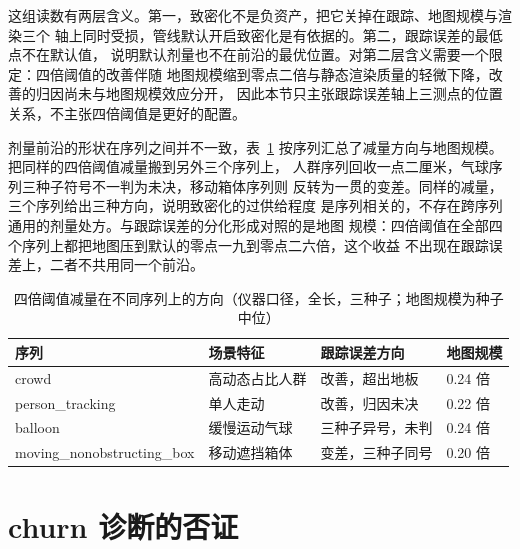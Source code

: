 这组读数有两层含义。第一，致密化不是负资产，把它关掉在跟踪、地图规模与渲染三个
轴上同时受损，管线默认开启致密化是有依据的。第二，跟踪误差的最低点不在默认值，
说明默认剂量也不在前沿的最优位置。对第二层含义需要一个限定：四倍阈值的改善伴随
地图规模缩到零点二倍与静态渲染质量的轻微下降，改善的归因尚未与地图规模效应分开，
因此本节只主张跟踪误差轴上三测点的位置关系，不主张四倍阈值是更好的配置。

剂量前沿的形状在序列之间并不一致，表~\ref{tab:study3-dose} 按序列汇总了减量方向与地图规模。把同样的四倍阈值减量搬到另外三个序列上，
人群序列回收一点二厘米，气球序列三种子符号不一判为未决，移动箱体序列则
反转为一贯的变差。同样的减量，三个序列给出三种方向，说明致密化的过供给程度
是序列相关的，不存在跨序列通用的剂量处方。与跟踪误差的分化形成对照的是地图
规模：四倍阈值在全部四个序列上都把地图压到默认的零点一九到零点二六倍，这个收益
不出现在跟踪误差上，二者不共用同一个前沿。

\begin{table}[htbp]
\centering
\caption{四倍阈值减量在不同序列上的方向（仪器口径，全长，三种子；地图规模为种子中位）}
\label{tab:study3-dose}
\begin{tabular}{llll}
\toprule
序列 & 场景特征 & 跟踪误差方向 & 地图规模 \\
\midrule
crowd & 高动态占比人群 & 改善，超出地板 & 0.24 倍 \\
person\_tracking & 单人走动 & 改善，归因未决 & 0.22 倍 \\
balloon & 缓慢运动气球 & 三种子异号，未判 & 0.24 倍 \\
moving\_nonobstructing\_box & 移动遮挡箱体 & 变差，三种子同号 & 0.20 倍 \\
\bottomrule
\end{tabular}
\end{table}

\section{churn 诊断的否证}
\label{sec:study3-churn}

